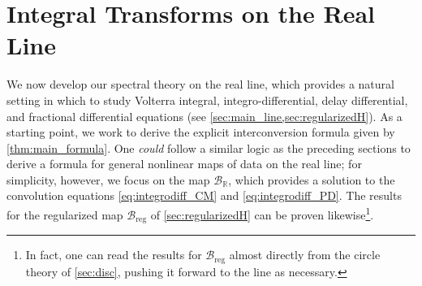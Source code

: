 \documentclass{cams-l} %
\newcommand{\dave}[1]{#1}\newcommand{\davebegin}{}\newcommand{\daveend}{}\newcommand{\george}[1]{#1}
\newcommand{\RR}{\mathbb R}
\newcommand{\cB}{\mathcal B}
\theoremstyle{definition}
\theoremstyle{remark}
\numberwithin{equation}{section}
\begin{document}
\section{Integral Transforms on the Real Line}\label{sec:line}
We now develop our spectral theory on the real line, which provides a natural setting in which to study Volterra integral, integro-differential, delay differential, and fractional differential equations (see \cref{sec:main_line,sec:regularizedH}). As a starting point, we work to derive the explicit interconversion formula given by \cref{thm:main_formula}. One \emph{could} follow a similar logic as the preceding sections to derive a formula for \dave{general nonlinear maps of data on the real line}; for simplicity, however, we focus on the map $\cB_\RR$, which provides a solution to the convolution equations \ref{eq:integrodiff_CM} and \ref{eq:integrodiff_PD}. The results for the regularized map $\cB_\mathrm{reg}$ of \cref{sec:regularizedH} can be proven likewise\footnote{In fact, one can read the results for $\cB_\mathrm{reg}$ almost directly from \dave{the circle theory of \cref{sec:disc}}, pushing it forward to the line as necessary.}. 
\end{document}
